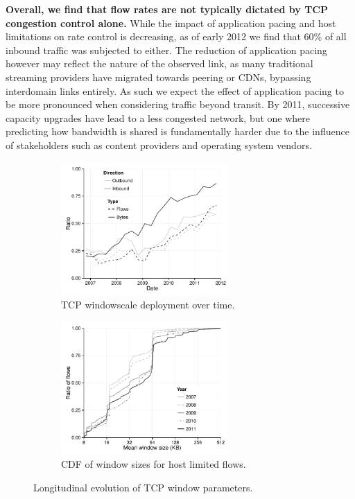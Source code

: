 \textbf{Overall, we find that flow rates are not typically dictated by \ac{TCP} congestion control alone.}
While the impact of application pacing and host limitations on rate control is decreasing, as of early 2012 we find that 60\% of all inbound traffic was subjected to either. 
The reduction of application pacing however may reflect the nature of the observed link, as many traditional streaming providers have migrated towards peering or \acp{CDN}, bypassing interdomain links entirely. As such we expect the effect of application pacing to be more pronounced when considering traffic beyond transit.
By 2011, successive capacity upgrades have lead to a less congested network, but one where predicting how bandwidth is shared is fundamentally harder due to the influence of stakeholders such as content providers and operating system vendors.

\begin{figure}[t]
    \begin{subfigure}[b]{.5\linewidth}
        \centering
        \includegraphics[width=2.5in]{figures/malawi/windowscale}
        \caption{\acs{TCP} windowscale deployment over time. \label{fig:windowscale}}
    \end{subfigure}%
    \begin{subfigure}[b]{.5\linewidth}
        \centering
        \includegraphics[width=2.5in]{figures/malawi/hostwindow}
        \caption{CDF of window sizes for host limited flows.\label{fig:hostwindow}}
    \end{subfigure}%
    \caption{Longitudinal evolution of \acs{TCP} window parameters. \label{fig:tcpWindowParams}}
\end{figure}

